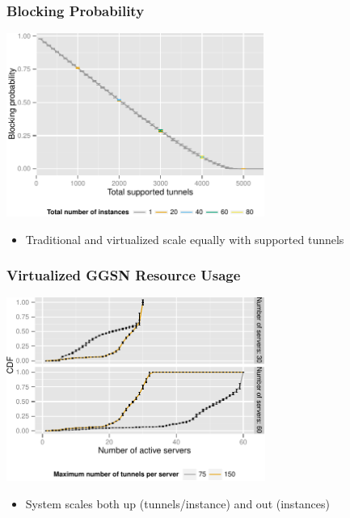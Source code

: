 \documentclass{beamer}
\begin{document}
\begin{frame}
	\frametitle{Blocking Probability}

	\begin{center}
		\includegraphics[height=6cm]{figures/virtual-blocking.pdf}
	\end{center}

	\begin{itemize}
		\item Traditional and virtualized scale equally with supported tunnels
	\end{itemize}
\end{frame}




\begin{frame}
	\frametitle{Virtualized GGSN Resource Usage}

	\begin{center}
		\includegraphics[height=6cm]{figures/instanceuse-multiserver-real.pdf}
	\end{center}

	\begin{itemize}
		\item System scales both up (tunnels/instance) and out (instances)
	\end{itemize}
\end{frame}
\end{document}
